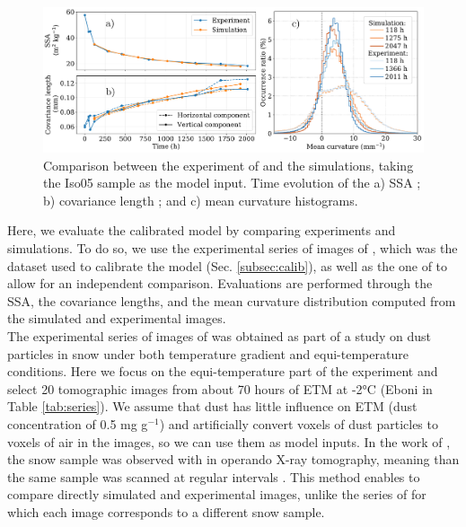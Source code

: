 \documentclass[draft,ms]{agujournal2019}
\begin{document}
\begin{figure}
    \centering
    \includegraphics[width=\linewidth]{Figures/microstruct_isoFlin_exp_simu.pdf}
    \caption{Comparison between the experiment of \protect{} and the simulations, taking the Iso05 sample as the model input. Time evolution of the a) SSA ; b) covariance length ; and c) mean curvature histograms.}
    \label{fig:flin_evaluation}
\end{figure}

Here, we evaluate the calibrated model by comparing experiments and simulations. To do so, we use the experimental series of images of , which was the dataset used to calibrate the model (Sec. \ref{subsec:calib}), as well as the one of  to allow for an independent comparison. Evaluations are performed through the SSA, the covariance lengths, and the mean curvature distribution computed from the simulated and experimental images.\\

 The experimental series of images of  was obtained as part of a study on dust particles in snow under both temperature gradient and equi-temperature conditions.
 Here we focus on the equi-temperature part of the experiment and select 20 tomographic images from about 70 hours of ETM at -2°C (Eboni in Table \ref{tab:series}). We assume that dust has little influence on ETM (dust concentration of 0.5 mg g$^{-1}$) and artificially convert voxels of dust particles to voxels of air in the images, so we can use them as model inputs. In the work of , the snow sample was observed with in operando X-ray tomography, meaning than the same sample was scanned at regular intervals \cite{calonne2015celldym}. This method enables to compare directly simulated and experimental images, unlike the series of  for which each image corresponds to a different snow sample.\\
\end{document}
